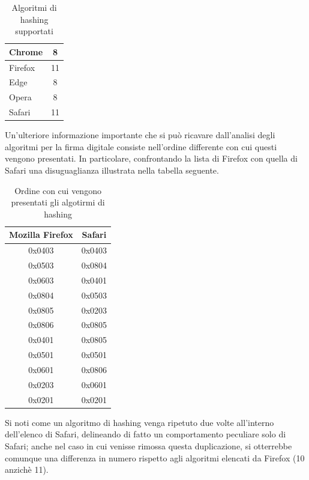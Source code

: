 \begin{table}[H]
	\centering
	\begin{tabular}{| l | c |}
		\hline
		\rowcolor[HTML]{FDD20A}Chrome & 8
		\\
		\hline
		\rowcolor[HTML]{FF9500}Firefox & 11
		\\
		\hline
		\rowcolor[HTML]{3277BC}Edge & 8
		\\
		\hline
		\rowcolor[HTML]{CB0B1E}Opera & 8
		\\
		\hline
		\rowcolor[HTML]{0FB5EE} Safari & 11
		\\
		\hline
		
	\end{tabular}
	\caption{Algoritmi di hashing supportati}
	\label{tab:hash}
\end{table}

Un'ulteriore informazione importante che si può ricavare dall'analisi degli algoritmi per la firma digitale consiste nell'ordine differente con cui questi vengono presentati. In particolare, confrontando la lista di Firefox con quella di Safari una disuguaglianza illustrata nella tabella seguente.

\begin{table}[H]
	\centering
	\begin{tabular}{| c | c |}
		\hline
		Mozilla Firefox & Safari
		\\
		\hline
		0x0403 & 0x0403
		\\
		\hline
		0x0503 & 0x0804
		\\
		\hline
		0x0603 & 0x0401
		\\
		\hline
		0x0804 & 0x0503
		\\
		\hline
		0x0805 & 0x0203
		\\
		\hline
		0x0806 & \cellcolor{red!10}0x0805
		\\
		\hline
		0x0401 & \cellcolor{red!10}0x0805
		\\
		\hline
		0x0501 & 0x0501
		\\
		\hline
		0x0601 & 0x0806
		\\
		\hline
		0x0203 & 0x0601
		\\
		\hline
		0x0201 & 0x0201
		\\
		\hline
		
	\end{tabular}
	\caption{Ordine con cui vengono presentati gli algotirmi di hashing}
	\label{tab:hashing}
\end{table}

Si noti come un algoritmo di hashing venga ripetuto due volte all'interno dell'elenco di Safari, delineando di fatto un comportamento peculiare solo di Safari; anche nel caso in cui venisse rimossa questa duplicazione, si otterrebbe comunque una differenza in numero rispetto agli algoritmi elencati da Firefox (10 anzichè 11).


